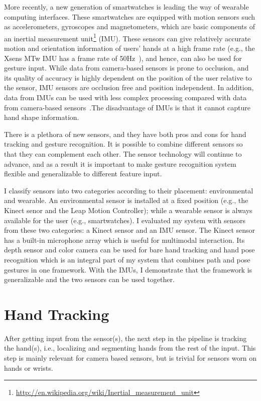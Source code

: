 More recently, a new generation of smartwatches is leading the way of wearable
computing interfaces.
These smartwatches are equipped with motion sensors such as
accelerometers, gyroscopes and magnetometers, which are basic components of an
inertial measurement
unit\footnote{\url{http://en.wikipedia.org/wiki/Inertial_measurement_unit}}
(IMU). These sensors can give relatively accurate motion and orientation
information of users' hands at a high frame rate (e.g., the Xsens MTw IMU has
a frame rate of 50Hz~\cite{Ruffieux2013}), and hence, can also be used for gesture input.
While data from camera-based sensors is prone to occlusion, and its quality
of accuracy is highly dependent on the position of the user relative to the
sensor, IMU sensors are occlusion free and position independent. In
addition, data from IMUs can be used with less complex processing
compared with data from camera-based sensors~\cite{Ruffieux2013}.The
disadvantage of IMUs is that it cannot capture hand shape information.

There is a plethora of new sensors, and they have both pros and cons for hand
tracking and gesture recognition. It is possible to combine different sensors
so that they can complement each other. The sensor technology will continue to
advance, and as a result it is important to make gesture recognition system
 flexible and generalizable to different feature input. 

I classify
sensors into two categories according to their placement:
environmental and wearable. An environmental sensor is installed at a fixed
position (e.g., the Kinect senor and the Leap Motion Controller); while a
wearable sensor is always available for the user (e.g., smartwatches). I
evaluated my system with sensors from these two categories: a Kinect sensor and
an IMU sensor.
The Kinect sensor has a built-in microphone array which is
useful for multimodal interaction. Its depth sensor and color camera can be used
for bare hand tracking and hand pose recognition which is an integral part of
my system that combines path and pose gestures in one framework. With the IMUs,
I demonstrate that the framework is generalizable and the two sensors can be used together.

\section{Hand Tracking}
After getting input from the sensor(s), the next step in the pipeline is
tracking the hand(s), i.e., localizing and segmenting hands from the rest of
the input. This step is mainly relevant for camera based sensors, but is trivial
for sensors worn on hands or wrists. 

